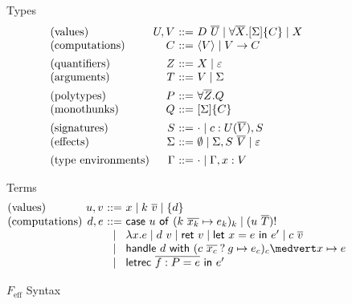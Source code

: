 \documentclass[preprint]{sigplanconf}
\makeatletter
\newcommand{\feff}{$F_\textrm{eff}$\xspace}
\newcommand{\many}{\overline}
\newcommand\ba{\begin{array}}
\newcommand\ea{\end{array}}
\newenvironment{equations}{\[\ba{@{}r@{~}c@{~}l@{}}}{\ea\]}
\newenvironment{syntax}{\[\ba{@{}l@{~}r@{~}c@{~}l@{}}}{\ea\]}
\newcommand{\rt}[1]{\langle{#1}\rangle}   %
\newcommand{\sig}{S}
\newcommand{\sigs}{\Sigma}
\newcommand{\effbox}[1]{[#1]}
\newcommand{\key}[1]{\mathsf{#1}}
\newcommand{\handleSymbol}{\mathbin{?}}
\newcommand{\handle}[2]{{#1} \handleSymbol {#2}}
\newcommand{\thunk}[1]{\{{#1}\}}
\newcommand{\force}[1]{{#1}!}
\newcommand\slab[1]{(\textrm{#1})}
\makeatother
\begin{document}
\begin{figure}
Types
\begin{syntax}
\slab{values}       &U, V   &::=& D~\many{U} \mid \forall \many{X}.\effbox{\sigs}\thunk{C} \mid X \\ %
\slab{computations} &C      &::=& \rt{V} \mid V \to C  %
\\[1ex]
\slab{quantifiers}  &Z      &::=& X \mid \varepsilon \\
\slab{arguments}    &T      &::=& V \mid \sigs
\\[1ex]
\slab{polytypes}    &P      &::=& \forall \many{Z}.Q \\
\slab{monothunks}   &Q      &::=& \effbox{\sigs}\thunk{C}
\\[1ex]
\slab{signatures}   &\sig   &::=& \cdot \mid c : U(\many{V}), \sig \\
\slab{effects}      &\sigs  &::=&
  \emptyset \mid \sigs, \sig~\many{V} \mid \varepsilon
\\[1ex]
\slab{type environments}     &\Gamma &::=& \cdot \mid \Gamma, x:V \\
\end{syntax}


Terms
\begin{syntax}
\slab{values}       &u, v &::=& x \mid k~\many{v} \mid \thunk{d} \\
\slab{computations} &d, e &::=& \key{case}~u~\key{of}~
                                   (k~\many{x_k} \mapsto e_k)_k
                                \mid \force{(u~\many{T})} \\
                    &     &\mid& \lambda x.e \mid d~v 
                           \mid \key{ret}~v \mid \key{let}~x=e~\key{in}~e'
                           \mid c~\many{v} \\
                         &&\mid& \key{handle} ~d~ \key{with}~
                                   (\handle{c~\many{x_c}}{g} \mapsto e_c)_c \medvert
                                   x        \mapsto e \\
                         &&\mid& \key{letrec}~\many{f : P = e}~\key{in}~e' \\
\end{syntax}
\caption{\feff Syntax}
\label{fig:feff-syntax}
\end{figure}
\end{document}
